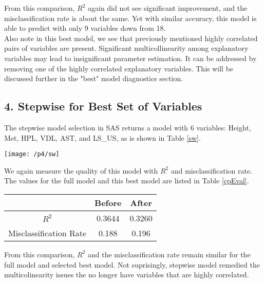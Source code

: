 \documentclass{article}
\begin{document}
From this comparison, $R^2$ again did not see significant improvement, and the misclassification rate is about the same. Yet with similar accuracy, this model is able to predict with only 9 variables down from 18. \\
Also note in this best model, we see that previously mentioned highly correlated pairs of variables are present. Significant multicollinearity among explanatory variables may lead to insignificant parameter estimation. It can be addressed by removing one of the highly correlated explanatory variables. This will be discussed further in the "best" model diagnostics section.\\

\subsection{4. Stepwise for Best Set of Variables}


The stepwise model selection in SAS returns a model with 6 variables: Height, Met, HPL, VDL, AST, and LS\_US, as is shown in Table \ref{sw}.\\
\begin{minipage}{\textwidth}		
 \label{sw}
\centering
\texttt{[image: /p4/sw]}
\end{minipage} \hfill

We again measure the quality of this model with $R^2$ and misclassification rate. The values for the full model and this best model are listed in Table \ref{cpEval}. \\

\begin{minipage}{\textwidth}
\centering
{} \label{cpEval}
\begin{tabular}{c | c | c}
\hline
& Before & After\\
\hline
$R^2$ & 0.3644 & 0.3260 \\
\hline
Misclassification Rate & 0.188 & 0.196\\
\hline
\end{tabular}
\end{minipage} \hfill

From this comparison, $R^2$ and the misclassification rate remain similar for the full model and selected best model. Not suprisingly, stepwise model remedied the multicolinearity issues the no longer have variables that are highly correlated.\\
\end{document}
